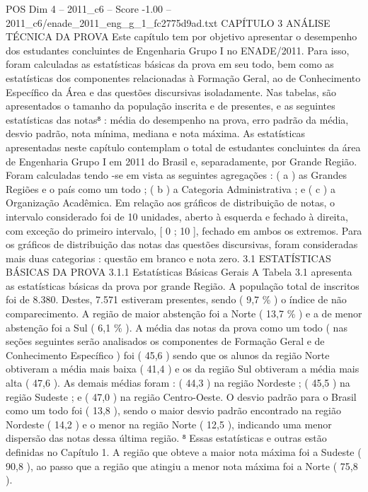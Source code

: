 \begin{textsample}{POS Dim 4 – 2011\_c6 – Score -1.00 – 2011\_c6/enade\_2011\_eng\_g\_1\_fc2775d9ad.txt}  \label{ex:f4_pos_301}
CAPÍTULO 3 ANÁLISE TÉCNICA DA PROVA Este capítulo tem por objetivo apresentar o desempenho dos estudantes concluintes de Engenharia Grupo I no ENADE/2011.
Para isso, foram calculadas as estatísticas básicas da prova em seu todo, bem como as estatísticas dos componentes relacionadas à Formação Geral, ao de Conhecimento Específico da Área e das questões discursivas isoladamente.
Nas tabelas, são apresentados o tamanho da população inscrita e de presentes, e as seguintes estatísticas das notas⁸ : média do desempenho na prova, erro padrão da média, desvio padrão, nota mínima, mediana e nota máxima.
As estatísticas apresentadas neste capítulo contemplam o total de estudantes concluintes da área de Engenharia Grupo I em 2011 do Brasil e, separadamente, por Grande Região.
Foram calculadas tendo -se em vista as seguintes agregações : ( a ) as Grandes Regiões e o país como um todo ; ( b ) a Categoria Administrativa ; e ( c ) a Organização Acadêmica.
Em relação aos gráficos de distribuição de notas, o intervalo considerado foi de 10 unidades, aberto à esquerda e fechado à direita, com exceção do primeiro intervalo, [ 0 ; 10 ], fechado em ambos os extremos.
Para os gráficos de distribuição das notas das questões discursivas, foram consideradas mais duas categorias : questão em branco e nota zero. 3.1 ESTATÍSTICAS BÁSICAS DA PROVA 3.1.1 Estatísticas Básicas Gerais A Tabela 3.1 apresenta as estatísticas básicas da prova por grande Região.
A população total de inscritos foi de 8.380.
Destes, 7.571 estiveram presentes, sendo ( 9,7 \% ) o índice de não comparecimento.
A região de maior abstenção foi a Norte ( 13,7 \% ) e a de menor abstenção foi a Sul ( 6,1 \% ).
A média das notas da prova como um todo ( nas seções seguintes serão analisados os componentes de Formação Geral e de Conhecimento Específico ) foi ( 45,6 ) sendo que os alunos da região Norte obtiveram a média mais baixa ( 41,4 ) e os da região Sul obtiveram a média mais alta ( 47,6 ).
As demais médias foram : ( 44,3 ) na região Nordeste ; ( 45,5 ) na região Sudeste ; e ( 47,0 ) na região Centro-Oeste.
O desvio padrão para o Brasil como um todo foi ( 13,8 ), sendo o maior desvio padrão encontrado na região Nordeste ( 14,2 ) e o menor na região Norte ( 12,5 ), indicando uma menor dispersão das notas dessa última região. ⁸ Essas estatísticas e outras estão definidas no Capítulo 1.
A região que obteve a maior nota máxima foi a Sudeste ( 90,8 ), ao passo que a região que atingiu a menor nota máxima foi a Norte ( 75,8 ).

\end{textsample}

